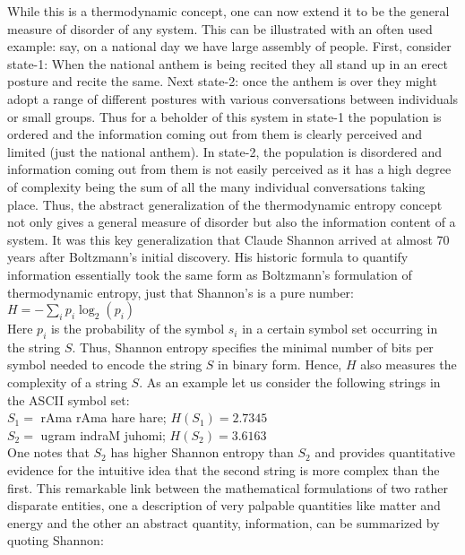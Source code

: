 \documentclass[11pt]{article} %
\numberwithin{equation}{section}
\begin{document}
While this is a thermodynamic concept, one can now extend it to be the general measure of disorder of any system. This can be illustrated with an often used example: say, on a national day we have large assembly of people. First, consider state-1: When the national anthem is being recited they all stand up in an erect posture and recite the same. Next state-2: once the anthem is over they might adopt a range of different postures with various conversations between individuals or small groups. Thus for a beholder of this system in state-1 the population is ordered and the information coming out from them is clearly perceived and limited (just the national anthem). In state-2, the population is disordered and information coming out from them is not easily perceived as it has a high degree of complexity being the sum of all the many individual conversations taking place. Thus, the abstract generalization of the thermodynamic entropy concept not only gives a general measure of disorder but also the information content of a system. It was this key generalization that Claude Shannon arrived at almost 70 years after Boltzmann’s initial discovery. His historic formula to quantify information essentially took the same form as Boltzmann’s formulation of thermodynamic entropy, just that Shannon’s is a pure number:\\

 $H=-\displaystyle \sum_i p_i \log_2(p_i)$\\

Here $p_i$ is the probability of the symbol $s_i$ in a certain symbol set occurring in the string $S$. Thus, Shannon entropy specifies the minimal number of bits per symbol needed to encode the string $S$ in binary form. Hence, $H$ also measures the complexity of a string $S$. As an example let us consider the following strings in the ASCII symbol set:\\
 $S_1=$ rAma rAma hare hare; $H(S_1)=2.7345$\\
 $S_2=$ ugram indraM juhomi; $H(S_2)=3.6163$ \\
One notes that $S_2$ has higher Shannon entropy than $S_2$ and provides quantitative evidence for the intuitive idea that the second string is more complex than the first. This remarkable link between the mathematical formulations of two rather disparate entities, one a description of very palpable quantities like matter and energy and the other an abstract quantity, information, can be summarized by quoting Shannon:\\
\end{document}

